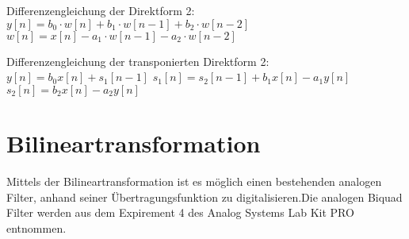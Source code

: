 \documentclass[
  ngerman,
  letterpaper,
  DIV=11]{scrreprt}
\begin{document}
Differenzengleichung der Direktform 2:
\(y[n] = b_0 \cdot w[n] + b_1 \cdot w[n-1] + b_2 \cdot w[n-2]\)
\(w[n] = x[n] - a_1 \cdot w[n-1] - a_2 \cdot w[n-2]\)

Differenzengleichung der transponierten Direktform 2:
\(y[n] = b_0 x[n] + s_1[n-1]\)
\(s_1[n] = s_2[n - 1] + b_1 x[n] - a_1 y[n]\)
\(s_2[n] = b_2 x[n] - a_2 y[n]\)

\chapter{Bilineartransformation}\label{bilineartransformation}

Mittels der Bilineartransformation ist es möglich einen bestehenden
analogen Filter, anhand seiner Übertragungsfunktion zu
digitalisieren.Die analogen Biquad Filter werden aus dem Expirement 4
des Analog Systems Lab Kit PRO entnommen.
\end{document}
